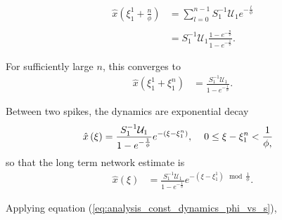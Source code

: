 \begin{enumerate}
\begin{align*}
\hat
{
	x
}
\left(
	\xi_1^1 + 
	\frac
	{
		n
	}
	{
		\phi
	}
\right)
&=
\sum_
{
	l=0
}
^
{
n-1
}
S_1^
{
	-1
}
\mathcal{U}_1
e^
{
	- \frac
	{
		l
	}
	{
		\phi
	}
}
%
\\
\\
%
&=
S_1^
{
	-1
}
\mathcal{U}_1
\frac
{
	1 - e^
	{
		-\frac
		{
			n
		}
		{
			\phi
		}
	}  
}
{
	1 - e^
	{
		-\frac
		{
			1
		}
		{
			\phi
		}
	}  
}.
\end{align*}

For sufficiently large $n$, this converges to 
\begin{align*}
\hat
{
	x
}
\left(
	\xi_1^1 + \xi_1^n
\right)
&=
\frac
{
	S_1^
	{
		-1
	}
	\mathcal{U}_1
}
{
	1 - e^
	{
		-\frac
		{
			1
		}
		{
			\phi
		}
	}
}.
\end{align*}

Between two spikes, the dynamics are exponential decay
\begin{align*}
\hat{
	x
}
\left(
	\xi
\right)
&=
\frac
{
S_1^
{
	-1
}
\mathcal{U}_1
}
{
	1 - e^
	{
		-\frac
		{
			1
		}
		{
			\phi
		}
	}
}
e^
{
	-\left(
		\xi - \xi_1^n
	\right)
}
,
\hspace{4mm}
0 \leq \xi - \xi_1^n  < 
\frac
{
	1
}
{
	\phi
,}
\end{align*}
so that the long term network estimate is
\begin{align*}
\label{eq:analysis:constant_driving_constant_dynamics_estimate_equation_implicit}
\hat{
x
}
\left(
	\xi
\right)
&=
\frac
{
	S_1^
	{
		-1
	}
	\mathcal{U}_1
}
{
	1 - e^
	{
		-\frac
		{
			1
		}
		{
			\phi
		}
	}
}
e^
{
	- (\xi - \xi_1^1) 
	\mod
	{
		\frac
		{
			1
		}
		{
			\phi
		}
	}
}.
\end{align*}

Applying equation (\ref{eq:analysis_const_dynamics_phi_vs_s}),


\end{enumerate}
